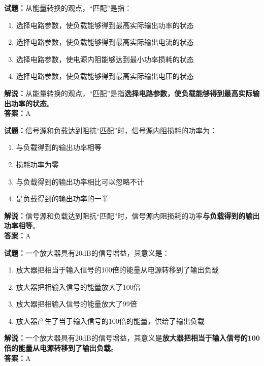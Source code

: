 \documentclass{ctexbook}
\begin{document}
\bigskip


\noindent\textbf{试题：}从能量转换的观点，“匹配”是指：
\begin{enumerate}[leftmargin=3em]
\item 选择电路参数，使负载能够得到最高实际输出功率的状态
\item 选择电路参数，使负载能够得到最高实际输出电流的状态
\item 选择电路参数，使电源内阻能够达到最小功率损耗的状态
\item 选择电路参数，使负载能够得到最高实际输出电压的状态
\end{enumerate}
\noindent\textbf{解说：}从能量转换的观点，“匹配”是指\textbf{选择电路参数，使负载能够得到最高实际输出功率的状态}。\\\noindent\textbf{答案：}A





\bigskip


\noindent\textbf{试题：}信号源和负载达到阻抗“匹配”时，信号源内阻损耗的功率为：
\begin{enumerate}[leftmargin=3em]
\item 与负载得到的输出功率相等
\item 损耗功率为零
\item 与负载得到的输出功率相比可以忽略不计
\item 是负载得到的输出功率的一半
\end{enumerate}
\noindent\textbf{解说：}信号源和负载达到阻抗“匹配”时，信号源内阻损耗的功率\textbf{与负载得到的输出功率相等}。\\\noindent\textbf{答案：}A



\bigskip


\noindent\textbf{试题：}一个放大器具有20dB的信号增益，其意义是：
\begin{enumerate}[leftmargin=3em]
\item 放大器把相当于输入信号的100倍的能量从电源转移到了输出负载
\item 放大器把相输入信号的能量放大了100倍
\item 放大器把相输入信号的能量放大了99倍
\item 放大器产生了当于输入信号的100倍的能量，供给了输出负载
\end{enumerate}
\noindent\textbf{解说：}一个放大器具有20dB的信号增益，其意义是\textbf{放大器把相当于输入信号的100倍的能量从电源转移到了输出负载}。\\\noindent\textbf{答案：}A
\end{document}
